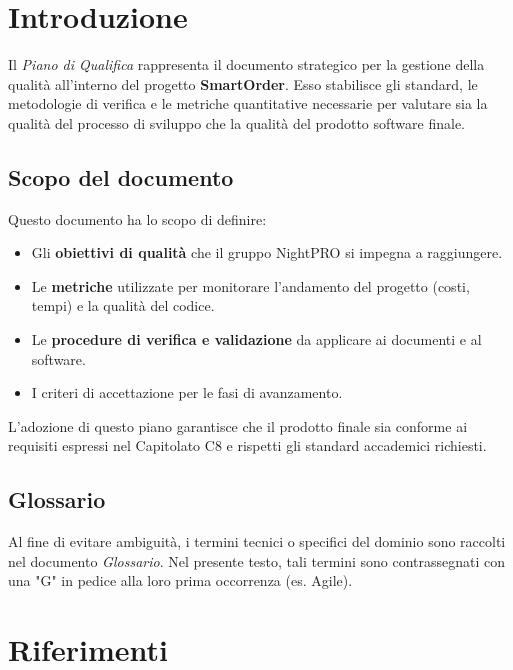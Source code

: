 \documentclass[a4paper,11pt,oneside]{scrartcl}
\begin{document}
\newpage
\section{Introduzione}

Il \textit{Piano di Qualifica} rappresenta il documento strategico per la gestione della qualità all'interno del progetto \textbf{SmartOrder}. Esso stabilisce gli standard, le metodologie di verifica e le metriche quantitative necessarie per valutare sia la qualità del processo di sviluppo che la qualità del prodotto software finale.

\subsection{Scopo del documento}
Questo documento ha lo scopo di definire:
\begin{itemize}
    \item Gli \textbf{obiettivi di qualità} che il gruppo NightPRO si impegna a raggiungere.
    \item Le \textbf{metriche} utilizzate per monitorare l'andamento del progetto (costi, tempi) e la qualità del codice.
    \item Le \textbf{procedure di verifica e validazione} da applicare ai documenti e al software.
    \item I criteri di accettazione per le fasi di avanzamento.
\end{itemize}

L'adozione di questo piano garantisce che il prodotto finale sia conforme ai requisiti espressi nel Capitolato C8 e rispetti gli standard accademici richiesti.

\subsection{Glossario}
Al fine di evitare ambiguità, i termini tecnici o specifici del dominio sono raccolti nel documento \textit{Glossario}.
Nel presente testo, tali termini sono contrassegnati con una "G" in pedice alla loro prima occorrenza (es. Agile{\scriptsize{}}).

\section{Riferimenti}
\end{document}

